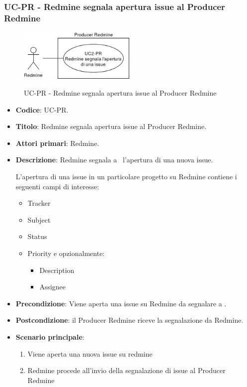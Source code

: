 \subsubsection{UC\theuccount-PR - Redmine segnala apertura issue al Producer Redmine}
    \begin{figure}[H]
		\centering
		\includegraphics[width=0.5\textwidth]{img/casi_d'uso/UC2.png}\\
		\caption{UC\theuccount-PR - Redmine segnala apertura issue al Producer Redmine}
	\end{figure}
	\begin{itemize}
		\item \textbf{Codice}: UC\theuccount-PR.
		\item \textbf{Titolo}: Redmine segnala apertura issue al Producer Redmine.
		\item \textbf{Attori primari}: Redmine.
		\item \textbf{Descrizione}: Redmine segnala a \progetto\ l'apertura di una nuova issue.
		
		L'apertura di una issue in un particolare progetto su Redmine contiene i seguenti campi di interesse:
		 \begin{itemize}
		 	\item Tracker
		 	\item Subject
		 	\item Status
		 	\item Priority e opzionalmente:
		 	\begin{itemize}
		 		\item Description
		 		\item Assignee
		 	\end{itemize}
		 \end{itemize}
		\item \textbf{Precondizione}: Viene aperta una issue su Redmine da
		segnalare a \progetto.
		\item \textbf{Postcondizione}: il Producer Redmine riceve la segnalazione da Redmine.
		\item \textbf{Scenario principale}: 
		\begin{enumerate}
			\item Viene aperta una nuova issue su redmine
			\item Redmine procede all'invio della segnalazione di issue al Producer Redmine
		\end{enumerate}
		
	\end{itemize}
